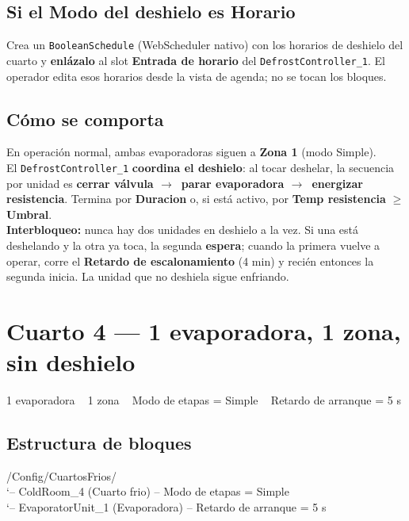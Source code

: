\documentclass[11pt,a4paper]{article}
\newcommand{\ra}{\textcolor{frio}{$\rightarrow$}}
\newcommand{\md}{\,\textcolor{gris}{\textbullet}\,}
\newcommand{\slot}[1]{\textbf{#1}}
\newcommand{\code}[1]{\texttt{#1}}
\begin{document}
\subsection{Si el Modo del deshielo es Horario}
Crea un \code{BooleanSchedule} (WebScheduler nativo) con los horarios de deshielo del cuarto y
\textbf{enlázalo} al slot \slot{Entrada de horario} del \code{DefrostController_1}. El operador edita
esos horarios desde la vista de agenda; no se tocan los bloques.

\subsection{Cómo se comporta}
\begin{comporta}
En operación normal, ambas evaporadoras siguen a \textbf{Zona 1} (modo Simple).\\[4pt]
El \code{DefrostController_1} \textbf{coordina el deshielo}: al tocar deshelar, la secuencia por unidad
es \textbf{cerrar válvula \ra\ parar evaporadora \ra\ energizar resistencia}. Termina por \slot{Duracion}
o, si está activo, por \slot{Temp resistencia} $\geq$ \slot{Umbral}.\\[4pt]
\textbf{Interbloqueo:} nunca hay dos unidades en deshielo a la vez. Si una está deshelando y la otra ya
toca, la segunda \textbf{espera}; cuando la primera vuelve a operar, corre el \slot{Retardo de
escalonamiento} (4 min) y recién entonces la segunda inicia. La unidad que no deshiela sigue enfriando.
\end{comporta}

\section{Cuarto 4 — 1 evaporadora, 1 zona, sin deshielo}
\begin{ficha}{}1 evaporadora \md\ 1 zona \md\ Modo de etapas = Simple \md\ Retardo de arranque = 5 s\end{ficha}

\subsection{Estructura de bloques}
\begin{arbol}
/Config/CuartosFrios/\\
`-- ColdRoom_4           (Cuarto frio)  -- Modo de etapas = Simple\\
\phantom{`-- }`-- EvaporatorUnit_1  (Evaporadora)  -- Retardo de arranque = 5 s
\end{arbol}
\end{document}
